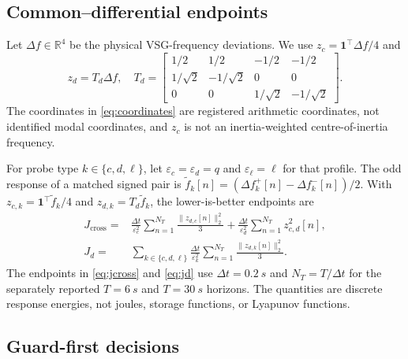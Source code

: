 \documentclass[conference,a4paper]{IEEEtran}
\begin{document}
\subsection{Common--differential endpoints}

Let $\Delta f\in\mathbb{R}^{4}$ be the physical VSG-frequency deviations. We
use $z_c=\mathbf{1}^{\top}\Delta f/4$ and
\begin{equation}
z_d=T_d\Delta f,\quad
T_d=\begin{bmatrix}
1/2&1/2&-1/2&-1/2\\
1/\sqrt{2}&-1/\sqrt{2}&0&0\\
0&0&1/\sqrt{2}&-1/\sqrt{2}
\end{bmatrix}.
\label{eq:coordinates}
\end{equation}
The coordinates in \eqref{eq:coordinates} are registered arithmetic
coordinates, not identified modal coordinates, and $z_c$ is not an
inertia-weighted centre-of-inertia frequency.

For probe type $k\in\{c,d,\ell\}$, let
$\varepsilon_c=\varepsilon_d=q$ and $\varepsilon_\ell=\ell$ for that profile.
The odd response of a matched signed pair is
$\widetilde f_k[n]=(\Delta f_k^+[n]-\Delta f_k^-[n])/2$. With
$z_{c,k}=\mathbf{1}^{\top}\widetilde f_k/4$ and
$z_{d,k}=T_d\widetilde f_k$, the lower-is-better endpoints are
\begin{align}
J_{\mathrm{cross}}={}&
\frac{\Delta t}{\varepsilon_c^2}
\sum_{n=1}^{N_T}\frac{\|z_{d,c}[n]\|_2^2}{3}
+\frac{\Delta t}{\varepsilon_d^2}
\sum_{n=1}^{N_T}z_{c,d}^2[n], \label{eq:jcross}\\
J_d={}&
\sum_{k\in\{c,d,\ell\}}
\frac{\Delta t}{\varepsilon_k^2}
\sum_{n=1}^{N_T}\frac{\|z_{d,k}[n]\|_2^2}{3}.
\label{eq:jd}
\end{align}
The endpoints in \eqref{eq:jcross} and \eqref{eq:jd} use
$\Delta t=\SI{0.2}{s}$ and $N_T=T/\Delta t$ for the separately
reported $T=\SI{6}{s}$ and $T=\SI{30}{s}$ horizons. The quantities are
discrete response energies, not joules, storage functions, or Lyapunov
functions.

\subsection{Guard-first decisions}
\end{document}
